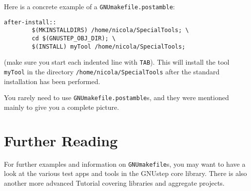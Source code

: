 \documentclass[a4paper]{article}
\begin{document}
Here is a concrete example of a \texttt{GNUmakefile.postamble}: 
\begin{verbatim}
after-install::
        $(MKINSTALLDIRS) /home/nicola/SpecialTools; \
        cd $(GNUSTEP_OBJ_DIR); \
        $(INSTALL) myTool /home/nicola/SpecialTools;
\end{verbatim}
(make sure you start each indented line with \texttt{TAB}).  This will
install the tool \texttt{myTool} in the directory
\texttt{/home/nicola/SpecialTools} after the standard installation has
been performed.

You rarely need to use \texttt{GNUmakefile.postamble}s, and they were
mentioned mainly to give you a complete picture.

\section{Further Reading}
For further examples and information on \texttt{GNUmakefile}s, you may
want to have a look at the various test apps and tools in the GNUstep
core library.  There is also another more advanced Tutorial covering
libraries and aggregate projects.
\end{document}
